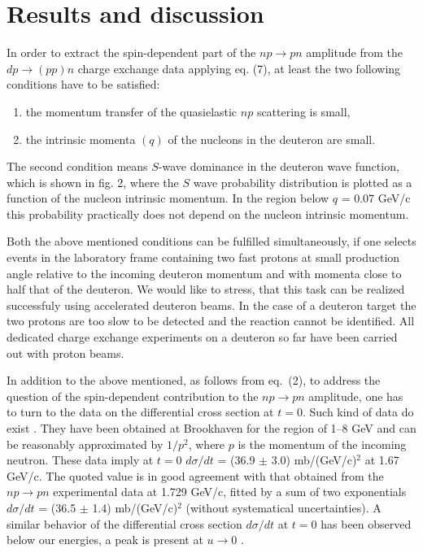 \documentclass[epj]{svjour}
\begin{document}
\section{Results and discussion}
In order to extract the spin-dependent part of the $np\to pn$ amplitude from the
$dp\to (pp)n$ charge exchange data applying eq. (7), at least the two following
conditions have to be satisfied:
\begin{enumerate}
\item the momentum transfer of the quasielastic $np$ scattering is small,
\item the intrinsic momenta $(q)$ of the nucleons in the \linebreak deuteron are
  small.
\end{enumerate}

The second condition means $S$-wave dominance in the deuteron wave function,
which is shown in fig. 2, where the $S$ wave probability distribution is plotted
as a function of the nucleon intrinsic momentum. In the region below $q$ = 0.07
GeV/c this probability practically does not depend on the nucleon intrinsic
momentum.

Both the above mentioned conditions can be fulfilled simultaneously, if one
selects events in the laboratory \linebreak frame containing two fast protons at
small production angle relative to the incoming deuteron momentum and with
momenta close to half that of the deuteron. We would like to stress, that this
task can be realized successfuly using accelerated deuteron beams. In the case
of a deuteron target the two protons are too slow to be detected and the
reaction cannot be identified. All dedicated charge exchange experiments on a
deuteron so far have been carried out with proton beams.

In addition to the above mentioned, as follows from eq.~(2), to address the
question of the spin-dependent contribution to the $np\to pn$ amplitude, one has
to turn to the data on the differential cross section at $t=0$. Such kind of
data do exist \cite{Fri,She}. They have been obtained at Brookhaven \cite{Fri}
for the region of 1--8 GeV and can be reasonably approximated by $1/p^2$, where
$p$ is the momentum of the incoming neutron. These data imply at $t=0$
$d\sigma/dt$ = (36.9 $\pm$ 3.0) mb/(GeV/c)$^2$ at 1.67 GeV/c. The quoted value
is in good agreement with that obtained from the $np\to pn$ experimental data
\cite{She} at 1.729 GeV/c, fitted by a sum of two exponentials $d\sigma/dt$ =
(36.5 $\pm$ 1.4) mb/(GeV/c)$^2$ (without systematical uncertainties). A similar
behavior of the differential cross section $d\sigma/dt$ at $t=0$ has been
observed below our energies, a peak is present at $u\to 0$ \cite{Bon}.
\end{document}
